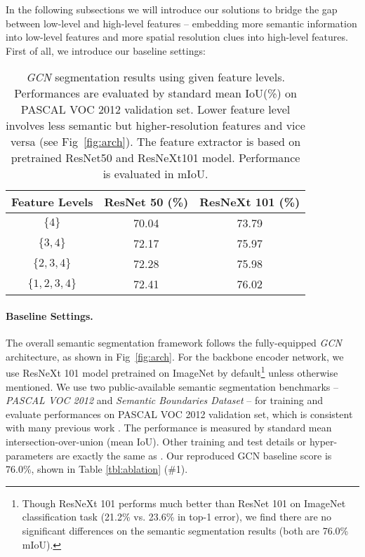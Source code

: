 \documentclass[runningheads]{llncs}
\begin{document}
In the following subsections we will introduce our solutions to bridge the gap between low-level and high-level features -- embedding more semantic information into low-level features and more spatial resolution clues into high-level features. First of all, we introduce our baseline settings:
\begin{table}

\begin{center}
\begin{tabular}{c|c|c}
\hline
Feature Levels & ResNet 50 (\%) & ResNeXt 101 (\%) \\
\hline $\{4\}$ & 70.04 & 73.79 \\
\hline
$\{3,4\}$ & 72.17& 75.97\\
\hline
$\{2,3,4\}$ & 72.28& 75.98\\
\hline
$\{1,2,3,4\}$ & 72.41& 76.02\\
\hline
\end{tabular}
\end{center}

\caption{\emph{GCN} \cite{Peng2017Large} segmentation results using given feature levels. Performances are evaluated by standard mean IoU(\%) on PASCAL VOC 2012 validation set. Lower feature level involves less semantic but higher-resolution features and vice versa (see Fig~\ref{fig:arch}). The feature extractor is based on pretrained ResNet50 \cite{He2016Deep} and ResNeXt101\cite{Xie2016Aggregated} model. Performance is evaluated in mIoU.}

\label{tbl:basicfusion}
\end{table}


\paragraph{Baseline Settings.} 
The overall semantic segmentation framework follows the fully-equipped \emph{GCN} \cite{Peng2017Large} architecture, as shown in Fig~\ref{fig:arch}. For the backbone encoder network, we use ResNeXt 101 \cite{Xie2016Aggregated} model pretrained on ImageNet by default\footnote{Though ResNeXt 101 performs much better than ResNet 101\cite{He2016Deep} on ImageNet classification task (21.2\% vs. 23.6\% in top-1 error), we find there are no significant differences on the semantic segmentation results (both are 76.0\% mIoU). } unless otherwise mentioned. We use two public-available semantic segmentation benchmarks -- \emph{PASCAL VOC 2012} \cite{Everingham2010The} and \emph{Semantic Boundaries Dataset} \cite{Hariharan2011Semantic} -- for training and evaluate performances on PASCAL VOC 2012 validation set, which is consistent with many previous work \cite{Chen2016DeepLab,Ghiasi2016Laplacian,Badrinarayanan2017SegNet,Yu2015Multi,Chen2017Rethinking,Islam_2017_CVPR,Peng2017Large,Wang2017Understanding,Zhao2016Pyramid,Long2015Fully,Lin2016RefineNet,Chen2014Semantic,Pohlen2016Full}. The performance is measured by standard mean intersection-over-union (mean IoU). Other training and test details or hyper-parameters are exactly the same as \cite{Peng2017Large}. Our reproduced GCN baseline score is 76.0\%, shown in Table \ref{tbl:ablation} (\#1).
\end{document}
